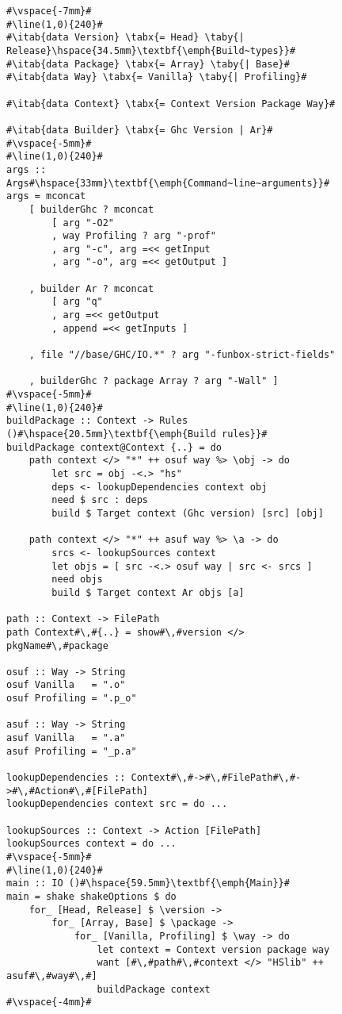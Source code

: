 \begin{figure}
\begin{lstlisting}
#\vspace{-7mm}#
#\line(1,0){240}#
#\itab{data Version} \tabx{= Head} \taby{| Release}\hspace{34.5mm}\textbf{\emph{Build~types}}#
#\itab{data Package} \tabx{= Array} \taby{| Base}#
#\itab{data Way} \tabx{= Vanilla} \taby{| Profiling}#

#\itab{data Context} \tabx{= Context Version Package Way}#

#\itab{data Builder} \tabx{= Ghc Version | Ar}#
#\vspace{-5mm}#
#\line(1,0){240}#
args :: Args#\hspace{33mm}\textbf{\emph{Command~line~arguments}}#
args = mconcat
    [ builderGhc ? mconcat
        [ arg "-O2"
        , way Profiling ? arg "-prof"
        , arg "-c", arg =<< getInput
        , arg "-o", arg =<< getOutput ]

    , builder Ar ? mconcat
        [ arg "q"
        , arg =<< getOutput
        , append =<< getInputs ]

    , file "//base/GHC/IO.*" ? arg "-funbox-strict-fields"

    , builderGhc ? package Array ? arg "-Wall" ]
#\vspace{-5mm}#
#\line(1,0){240}#
buildPackage :: Context -> Rules ()#\hspace{20.5mm}\textbf{\emph{Build rules}}#
buildPackage context@Context {..} = do
    path context </> "*" ++ osuf way %> \obj -> do
        let src = obj -<.> "hs"
        deps <- lookupDependencies context obj
        need $ src : deps
        build $ Target context (Ghc version) [src] [obj]

    path context </> "*" ++ asuf way %> \a -> do
        srcs <- lookupSources context
        let objs = [ src -<.> osuf way | src <- srcs ]
        need objs
        build $ Target context Ar objs [a]

path :: Context -> FilePath
path Context#\,#{..} = show#\,#version </> pkgName#\,#package

osuf :: Way -> String
osuf Vanilla   = ".o"
osuf Profiling = ".p_o"

asuf :: Way -> String
asuf Vanilla   = ".a"
asuf Profiling = "_p.a"

lookupDependencies :: Context#\,#->#\,#FilePath#\,#->#\,#Action#\,#[FilePath]
lookupDependencies context src = do ...

lookupSources :: Context -> Action [FilePath]
lookupSources context = do ...
#\vspace{-5mm}#
#\line(1,0){240}#
main :: IO ()#\hspace{59.5mm}\textbf{\emph{Main}}#
main = shake shakeOptions $ do
    for_ [Head, Release] $ \version ->
        for_ [Array, Base] $ \package ->
            for_ [Vanilla, Profiling] $ \way -> do
                let context = Context version package way
                want [#\,#path#\,#context </> "HSlib" ++ asuf#\,#way#\,#]
                buildPackage context
#\vspace{-4mm}#
\end{lstlisting}


\end{figure}
